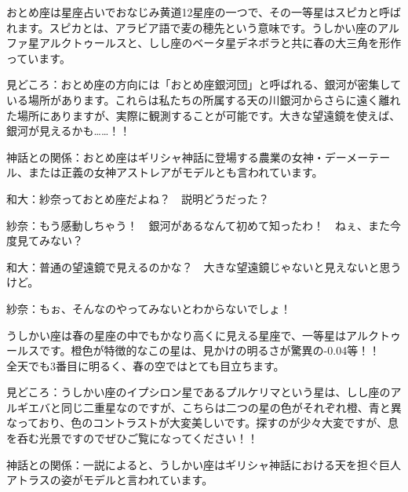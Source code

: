 \documentclass[supernova_2023]{subfiles}
\begin{document}
\phantom{a}\par
{}
{}
\begin{tcolorbox}[title=2. おとめ座, breakable]
おとめ座は星座占いでおなじみ黄道12星座の一つで、その一等星はスピカと呼ばれます。スピカとは、アラビア語で麦の穂先という意味です。うしかい座のアルファ星アルクトゥールスと、しし座のベータ星デネボラと共に春の大三角を形作っています。


\phantom{a}\par
見どころ：おとめ座の方向には「おとめ座銀河団」と呼ばれる、銀河が密集している場所があります。これらは私たちの所属する天の川銀河からさらに遠く離れた場所にありますが、実際に観測することが可能です。大きな望遠鏡を使えば、銀河が見えるかも……！！


\phantom{a}\par
神話との関係：おとめ座はギリシャ神話に登場する農業の女神・デーメーテール、または正義の女神アストレアがモデルとも言われています。  
\end{tcolorbox}

\phantom{a}\par
和大：紗奈っておとめ座だよね？　説明どうだった？


\phantom{a}\par
紗奈：もう感動しちゃう！　銀河があるなんて初めて知ったわ！　ねぇ、また今度見てみない？


\phantom{a}\par
和大：普通の望遠鏡で見えるのかな？　大きな望遠鏡じゃないと見えないと思うけど。


\phantom{a}\par
紗奈：もぉ、そんなのやってみないとわからないでしょ！


\phantom{a}\par
{}
{}
\begin{tcolorbox}[title=3. うしかい座, breakable]
うしかい座は春の星座の中でもかなり高くに見える星座で、一等星はアルクトゥールスです。橙色が特徴的なこの星は、見かけの明るさが驚異の-0.04等！！　全天でも3番目に明るく、春の空ではとても目立ちます。


\phantom{a}\par
見どころ：うしかい座のイプシロン星であるプルケリマという星は、しし座のアルギエバと同じ二重星なのですが、こちらは二つの星の色がそれぞれ橙、青と異なっており、色のコントラストが大変美しいです。探すのが少々大変ですが、息を呑む光景ですのでぜひご覧になってください！！


\phantom{a}\par
神話との関係：一説によると、うしかい座はギリシャ神話における天を担ぐ巨人アトラスの姿がモデルと言われています。
\end{tcolorbox}
\end{document}
